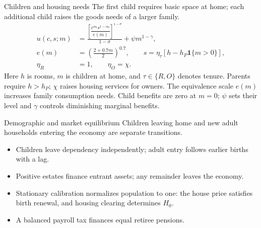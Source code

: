 \documentclass[11pt,aspectratio=169]{beamer}
\begin{document}
\begin{frame}{Children and housing needs}
\small
The first child requires basic space at home; each additional child raises the goods needs of a larger family.
\[
\begin{aligned}
u(c,s;m)&=\frac{\left[\dfrac{c^{\alpha_0}s^{1-\alpha_0}}{e(m)}\right]^{1-\sigma}}{1-\sigma}
 +\psi m^{1-\gamma},\\
e(m)&=\left(\frac{2+0.7m}{2}\right)^{0.7},\qquad
s=\eta_{\tau}\left[h-h_P\mathbf 1\{m>0\}\right],\\
\eta_{R}&=1,\qquad \eta_{O}=\chi.
\end{aligned}
\]
Here $h$ is rooms, $m$ is children at home, and $\tau\in\{R,O\}$ denotes tenure. Parents require $h>h_P$; $\chi$ raises housing services for owners. The equivalence scale $e(m)$ increases family consumption needs. Child benefits are zero at $m=0$; $\psi$ sets their level and $\gamma$ controls diminishing marginal benefits.
\end{frame}

\begin{frame}{Demographic and market equilibrium}
\small
Children leaving home and new adult households entering the economy are separate transitions.
\medskip
\begin{itemize}\setlength\itemsep{5pt}
 \item Children leave dependency independently; adult entry follows earlier births with a lag.
 \item Positive estates finance entrant assets; any remainder leaves the economy.
 \item Stationary calibration normalizes population to one: the house price satisfies birth renewal, and housing clearing determines $H_0$.
 \item A balanced payroll tax finances equal retiree pensions.
\end{itemize}

\end{frame}
\end{document}
